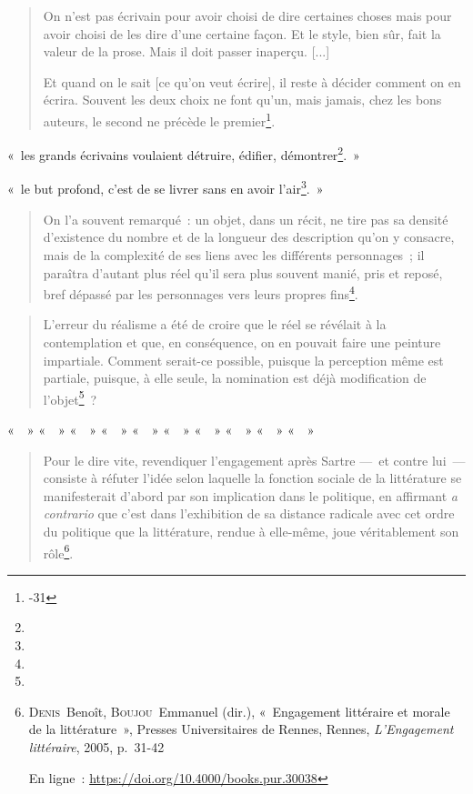 \documentclass[12pt, a4paper]{article}
\begin{document}
\begin{quote}
    On n'est pas écrivain pour avoir choisi de dire certaines choses mais pour avoir choisi de les dire d'une certaine façon. Et le style, bien sûr, fait la valeur de la prose. Mais il doit passer inaperçu. [...]

    Et quand on le sait [ce qu'on veut écrire], il reste à décider comment on en écrira. Souvent les deux choix ne font qu'un, mais jamais, chez les bons auteurs, le second ne précède le premier\footnote{-31}.
\end{quote}

«~les grands écrivains voulaient détruire, édifier, démontrer\footnote{}.~»

«~le but profond, c'est de se livrer sans en avoir l'air\footnote{}.~»

\begin{quote}
    On l'a souvent remarqué~: un objet, dans un récit, ne tire pas sa densité d'existence du nombre et de la longueur des description qu'on y consacre, mais de la complexité de ses liens avec les différents personnages~; il paraîtra d'autant plus réel qu'il sera plus souvent manié, pris et reposé, bref dépassé par les personnages vers leurs propres fins\footnote{}.
\end{quote}

\begin{quote}
    L'erreur du réalisme a été de croire que le réel se révélait à la contemplation et que, en conséquence, on en pouvait faire une peinture impartiale. Comment serait-ce possible, puisque la perception même est partiale, puisque, à elle seule, la nomination est déjà modification de l'objet\footnote{}~?
\end{quote}

«~~»
«~~»
«~~»
«~~»
«~~»
«~~»
«~~»
«~~»
«~~»
«~~»


\begin{quote}
    Pour le dire vite, revendiquer l’engagement après Sartre —~et contre lui~— consiste à réfuter l’idée selon laquelle la fonction sociale de la littérature se manifesterait d’abord par son implication dans le politique, en affirmant \textit{a contrario} que c’est dans l’exhibition de sa distance radicale avec cet ordre du politique que la littérature, rendue à elle-même, joue véritablement son rôle\footnote{\textsc{Denis}~Benoît, \textsc{Boujou}~Emmanuel (dir.), «~Engagement littéraire et morale de la littérature~», Presses Universitaires de Rennes, Rennes, \textit{L'Engagement littéraire}, 2005, p.~31-42
            
            En ligne~: \hyperlink{https://doi.org/10.4000/books.pur.30038}{https://doi.org/10.4000/books.pur.30038}}.
\end{quote}
\end{document}
